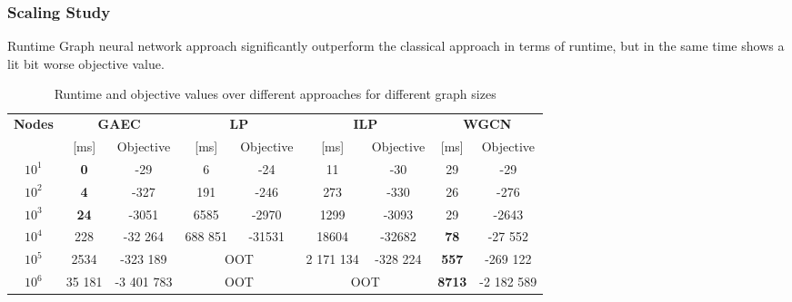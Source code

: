 \documentclass{beamer}
\begin{document}
\begin{frame}
    \frametitle{Scaling Study}

    \begin{block}{Runtime}
        Graph neural network approach significantly outperform the
        classical approach in terms of runtime, but in the same time
        shows a lit bit worse objective value.
    \end{block}

    \begin{table}
        \scalebox{0.7}
        {
            \begin{tabular}{|c|*{8}{c|}}
                \hline
                \multirow{2}{*}{\textbf{Nodes}} & \multicolumn{2}{c|}{\textbf{GAEC}} & \multicolumn{2}{c|}{\textbf{LP}} & \multicolumn{2}{c|}{\textbf{ILP}} & \multicolumn{2}{c|}{\textbf{WGCN}}                                                          \\
                                                & [ms]                               & Objective                        & [ms]                              & Objective                          & [ms]          & Objective    & [ms]        & Objective \\
                \hline
                \hline
                $10^1$                          & \textbf{0 }                        & -29                              & 6                                 & -24                                & 11            & -30          & 29          & -29       \\
                $10^2$                          & \textbf{4 }                        & -327                             & 191                               & -246                               & 273           & -330         & 26          & -276      \\
                $10^3$                          & \textbf{24}                        & -3051                            & 6585                              & -2970                              & 1299          & -3093        & 29          & -2643     \\
                $10^4$                          & 228                                & -32 264                          & 688 851                           & -31531                             & 18604         & -32682       & \textbf{78} & -27 552   \\
                $10^5$                          & 2534                               & -323 189                         & \multicolumn{2}{c|}{OOT}          & 2 171 134                          & -328 224      & \textbf{557} & -269 122                \\
                $10^6$                          & 35 181                             & -3 401 783                       & \multicolumn{2}{c|}{OOT}          & \multicolumn{2}{c|}{OOT}           & \textbf{8713} & -2 182 589                             \\
                \hline
            \end{tabular}
        }
        \caption{Runtime and objective values over different approaches for
            different graph sizes}
    \end{table}


\end{frame}
\end{document}
